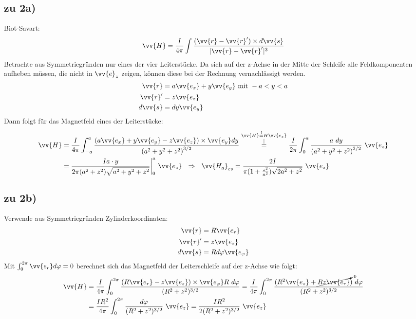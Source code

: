 \documentclass[a4paper,12pt]{article}
\begin{document}
\subsection*{zu 2a)}
Biot-Savart: $$\vv{H}=\frac{I}{4\pi}\int\frac{(\vv{r}-\vv{r}')\times d\vv{s}}{|\vv{r}-\vv{r}'|^3}$$
Betrachte aus Symmetriegründen nur eines der vier Leiterstücke. Da sich auf der z-Achse in der Mitte der Schleife alle Feldkomponenten aufheben müssen, die nicht in $\vv{e}_z$ zeigen, können diese bei der Rechnung vernachlässigt werden.\\ \begin{align*}
\vv{r}&=a\vv{e_x}+y\vv{e_y}\ \mathrm{mit\ } -a<y<a\\
\vv{r}'&=z\vv{e_z}\\
d\vv{s}&=dy\vv{e_y}
\end{align*}
Dann folgt für das Magnetfeld eines der Leiterstücke: \begin{align*}
\vv{H}&=\frac{I}{4\pi}\int_{-a}^{a}\frac{(a\vv{e_x}+y\vv{e_y}-z\vv{e_z})\times \vv{e_y}dy}{\left(a^2+y^2+z^2\right)^{3/2}}\overset{\substack{\vv{H}\overset{!}{=}H\vv{e_z}\\|}}{=}\frac{I}{2\pi}\int_0^{a}\frac{a\ dy}{\left(a^2+y^2+z^2\right)^{3/2}}\ \vv{e_z}\\
&=\frac{Ia\cdot y}{2\pi(a^2+z^2)\sqrt{a^2+y^2+z^2}}\bigg\rvert_0^{a}\ \vv{e_z}\ \ \Rightarrow\ \ \vv{H_g}_{es}=\frac{2I}{\pi(1+\frac{z^2}{a^2})\sqrt{2a^2+z^2}}\ \vv{e_z}
\end{align*}
\subsection*{zu 2b)}
Verwende aus Symmetriegründen Zylinderkoordinaten:
\begin{align*}
\vv{r}&=R\vv{e_r}\\
\vv{r}'&=z\vv{e_z}\\
d\vv{s}&=Rd\varphi\vv{e_\varphi}
\end{align*}
Mit $\int_0^{2\pi}\vv{e_r}d\varphi=0$ berechnet sich das Magnetfeld der Leiterschleife auf der z-Achse wie folgt:
\begin{align*}
\vv{H}&=\frac{I}{4\pi}\int_{0}^{2\pi}\frac{(R\vv{e_r}-z\vv{e_z})\times\vv{e_{\varphi}}R\ d\varphi}{(R^2+z^2)^{3/2}}=\frac{I}{4\pi}\int_{0}^{2\pi}\frac{(R^2\vv{e_z}+\cancelto{0}{Rz\vv{e_r}})\ d\varphi}{(R^2+z^2)^{3/2}}\\
&=\frac{IR^2}{4\pi}\int_{0}^{2\pi}\frac{d\varphi}{(R^2+z^2)^{3/2}}\ \vv{e_z}=\frac{IR^2}{2(R^2+z^2)^{3/2}}\ \vv{e_z}
\end{align*}
\end{document}
